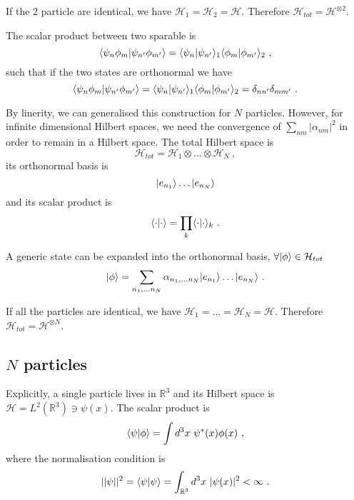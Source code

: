     If the $2$ particle are identical, we have $\mathcal H_1 = \mathcal H_2 = \mathcal H$. Therefore $\mathcal H_{tot} = \mathcal H^{\otimes 2}$.

    The scalar product between two sparable is 
    \begin{equation*}
        \langle\psi_n \phi_m\vert\psi_{n'} \phi_{m'}\rangle = \langle\psi_n\vert\psi_{n'}\rangle_1 \langle\phi_m\vert\phi_{m'}\rangle_2 ~,
    \end{equation*}
    such that if the two states are orthonormal we have
    \begin{equation*}
        \langle\psi_n \phi_m\vert\psi_{n'} \phi_{m'}\rangle = \langle\psi_n\vert\psi_{n'}\rangle_1 \langle\phi_m\vert\phi_{m'}\rangle_2 = \delta_{nn'} \delta_{mm'} ~. 
    \end{equation*}
    
    By linerity, we can generalised this construction for $N$ particles. However, for infinite dimensional Hilbert spaces, we need the convergence of $\sum_{nm} |\alpha_{nm}|^2$ in order to remain in a Hilbert space. The total Hilbert space is 
    \begin{equation*}
        \mathcal H_{tot} = \mathcal H_1 \otimes \ldots \otimes \mathcal H_N ~,
    \end{equation*}
    its orthonormal basis is 
    \begin{equation*}
        \vert e_{n_1}\rangle \ldots \vert e_{n_N}\rangle 
    \end{equation*}
    and its scalar product is 
    \begin{equation*}
        \langle\cdot\vert\cdot\rangle = \prod_k \langle\cdot\vert\cdot\rangle_k ~.
    \end{equation*}

    A generic state can be expanded into the orthonormal basis, $\forall \vert\phi\rangle \in \mathcal H_{tot}$ 
    \begin{equation*}
        \vert\phi\rangle = \sum_{n_1, \ldots n_N} \alpha_{n_1, \ldots n_N} \vert e_{n_1}\rangle \ldots \vert e_{n_N}\rangle ~.
    \end{equation*}

    If all the particles are identical, we have $\mathcal H_1 = \ldots = \mathcal H_N = \mathcal H$. Therefore $\mathcal H_{tot} = \mathcal H^{\otimes N}$.

\subsection{$N$ particles}

    Explicitly, a single particle lives in $\mathbb R^3$ and its Hilbert space is $\mathcal H = L^2 (\mathbb R^3) \ni \psi(x)$. The scalar product is 
    \begin{equation*}
        \langle\psi\vert\phi\rangle = \int d^3 x ~ \psi^*(x) \phi(x) ~,
    \end{equation*}
    where the normalisation condition is 
    \begin{equation*}
        ||\psi||^2 = \langle\psi\vert\psi\rangle = \int_{\mathbb R^3} d^3 x ~ |\psi(x)|^2 < \infty ~.
    \end{equation*}

